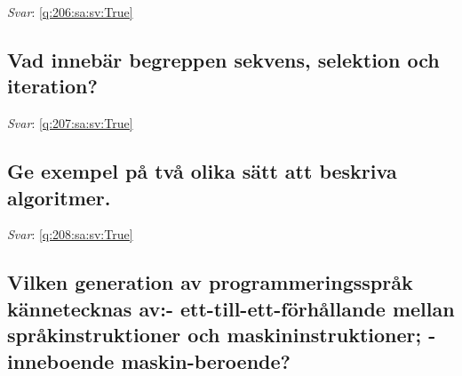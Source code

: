 \documentclass[a4paper,11pt,oneside]{article}
\begin{document}
\begin{sloppypar}
\label{q:206:sa:sv:False}

\vspace{2cm}

\noindent\makebox[\textwidth]{\hrulefill}

\vspace{1cm}

\textit{Svar}: \autoref{q:206:sa:sv:True}



\subsection{Vad inneb\"ar begreppen sekvens, selektion och iteration?}

\label{q:207:sa:sv:False}

\vspace{2cm}

\noindent\makebox[\textwidth]{\hrulefill}

\vspace{1cm}

\textit{Svar}: \autoref{q:207:sa:sv:True}



\subsection{Ge exempel p\r{a} tv\r{a} olika s\"att att beskriva algoritmer.}

\label{q:208:sa:sv:False}

\vspace{2cm}

\noindent\makebox[\textwidth]{\hrulefill}

\vspace{1cm}

\textit{Svar}: \autoref{q:208:sa:sv:True}



\subsection{Vilken generation av programmeringsspr\r{a}k k\"annetecknas av:- ett-till-ett-f\"orh\r{a}llande mellan spr\r{a}kinstruktioner och maskininstruktioner; - inneboende maskin-beroende?}

\label{q:209:sa:sv:False}

\vspace{2cm}

\noindent\makebox[\textwidth]{\hrulefill}

\vspace{1cm}


\end{sloppypar}
\end{document}
